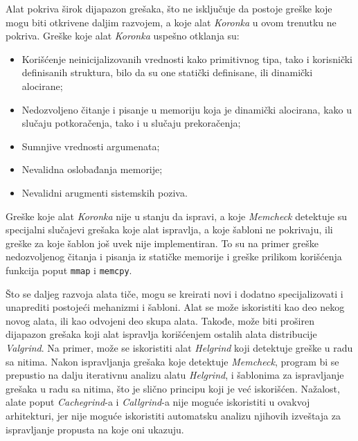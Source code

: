 \documentclass[12pt,oneside]{memoir}
\theoremstyle{plain}
\theoremstyle{definition}
\begin{document}
Alat pokriva širok dijapazon grešaka, što ne isključuje da postoje greške koje mogu biti otkrivene daljim razvojem, a koje alat \textit{Koronka} u ovom trenutku ne pokriva. Greške koje alat \textit{Koronka} uspešno otklanja su:
\begin{itemize}
\item Korišćenje neinicijalizovanih vrednosti kako primitivnog tipa, tako i korisnički definisanih struktura, bilo da su one statički definisane, ili dinamički alocirane;
\item Nedozvoljeno čitanje i pisanje u memoriju koja je dinamički alocirana, kako u slučaju potkoračenja, tako i u slučaju prekoračenja;
\item Sumnjive vrednosti argumenata;
\item Nevalidna oslobađanja memorije;
\item Nevalidni arugmenti sistemskih poziva.
\end{itemize}
Greške koje alat \textit{Koronka} nije u stanju da ispravi, a koje \textit{Memcheck} detektuje su specijalni slučajevi grešaka koje alat ispravlja, a koje šabloni ne pokrivaju, ili greške za koje šablon još uvek nije implementiran.
To su na primer greške nedozvoljenog čitanja i pisanja iz statičke memorije i greške prilikom korišćenja funkcija poput \texttt{mmap} i \texttt{memcpy}.

Što se daljeg razvoja alata tiče, mogu se kreirati novi i dodatno specijalizovati i unaprediti postojeći mehanizmi i šabloni. Alat se može iskoristiti kao deo nekog novog alata, ili kao odvojeni deo skupa alata. Takođe, može biti proširen dijapazon grešaka koji alat ispravlja korišćenjem ostalih alata distribucije \textit{Valgrind}. Na primer, može se iskoristiti alat \textit{Helgrind} koji detektuje greške u radu sa nitima. Nakon ispravljanja grešaka koje detektuje \textit{Memcheck}, program bi se prepustio na dalju iterativnu analizu alatu \textit{Helgrind}, i šablonima za ispravljanje grešaka u radu sa nitima, što je slično principu koji je već iskorišćen. Nažalost, alate poput \textit{Cachegrind}-a i \textit{Callgrind}-a nije moguće iskoristiti u ovakvoj arhitekturi, jer nije moguće iskoristiti automatsku analizu njihovih izveštaja za ispravljanje propusta na koje oni ukazuju.


\literatura
\end{document}
